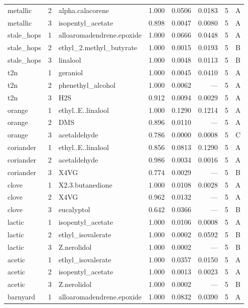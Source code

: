 \begin{longtable}{@{}p{} r p{} r r r r c@{}}
metallic & 2 & alpha.\allowbreak{}calacorene & 1.000 & 0.0506 & 0.0183 & 5 & A \\
metallic & 3 & isopentyl\_acetate & 0.898 & 0.0047 & 0.0080 & 5 & A \\
stale\_hops & 1 & alloaromadendrene.\allowbreak{}epoxide & 1.000 & 0.0666 & 0.0448 & 5 & A \\
stale\_hops & 2 & ethyl\_2.\allowbreak{}methyl\_butyrate & 1.000 & 0.0015 & 0.0193 & 5 & B \\
stale\_hops & 3 & linalool & 1.000 & 0.0048 & 0.0113 & 5 & B \\
t2n & 1 & geraniol & 1.000 & 0.0045 & 0.0410 & 5 & A \\
t2n & 2 & phenethyl\_alcohol & 1.000 & 0.0062 & --- & 5 & A \\
t2n & 3 & H2S & 0.912 & 0.0094 & 0.0029 & 5 & A \\
orange & 1 & ethyl.\allowbreak{}.\allowbreak{}E.\allowbreak{}.\allowbreak{}linalool & 1.000 & 0.1290 & 0.1214 & 5 & A \\
orange & 2 & DMS & 0.896 & 0.0110 & --- & 5 & A \\
orange & 3 & acetaldehyde & 0.786 & 0.0000 & 0.0008 & 5 & C \\
coriander & 1 & ethyl.\allowbreak{}.\allowbreak{}E.\allowbreak{}.\allowbreak{}linalool & 0.856 & 0.0813 & 0.1290 & 5 & A \\
coriander & 2 & acetaldehyde & 0.986 & 0.0034 & 0.0016 & 5 & A \\
coriander & 3 & X4VG & 0.774 & 0.0029 & --- & 5 & B \\
clove & 1 & X2.\allowbreak{}3.\allowbreak{}butanedione & 1.000 & 0.0108 & 0.0028 & 5 & A \\
clove & 2 & X4VG & 0.962 & 0.0132 & --- & 5 & A \\
clove & 3 & eucalyptol & 0.642 & 0.0366 & --- & 5 & B \\
lactic & 1 & isopentyl\_acetate & 1.000 & 0.0106 & 0.0008 & 5 & A \\
lactic & 2 & ethyl\_isovalerate & 1.000 & 0.0002 & 0.0592 & 5 & B \\
lactic & 3 & Z.\allowbreak{}nerolidol & 1.000 & 0.0002 & --- & 5 & B \\
acetic & 1 & ethyl\_isovalerate & 1.000 & 0.0357 & 0.0150 & 5 & A \\
acetic & 2 & isopentyl\_acetate & 1.000 & 0.0013 & 0.0023 & 5 & A \\
acetic & 3 & Z.\allowbreak{}nerolidol & 1.000 & 0.0002 & --- & 5 & B \\
barnyard & 1 & alloaromadendrene.\allowbreak{}epoxide & 1.000 & 0.0832 & 0.0390 & 5 & A \\

\end{longtable}
